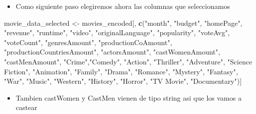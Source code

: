 \documentclass[
]{article}
\newenvironment{Shaded}{\begin{snugshade}}{\end{snugshade}}
\newcommand{\FunctionTok}[1]{\textcolor[rgb]{0.13,0.29,0.53}{\textbf{#1}}}
\newcommand{\NormalTok}[1]{#1}
\newcommand{\OtherTok}[1]{\textcolor[rgb]{0.56,0.35,0.01}{#1}}
\newcommand{\SpecialCharTok}[1]{\textcolor[rgb]{0.81,0.36,0.00}{\textbf{#1}}}
\newcommand{\StringTok}[1]{\textcolor[rgb]{0.31,0.60,0.02}{#1}}
\providecommand{\tightlist}{%
  \setlength{\itemsep}{0pt}\setlength{\parskip}{0pt}}
\begin{document}
\begin{itemize}
\tightlist
\item
  Como siguiente paso elegiremos ahora las columnas que seleccionamos
\end{itemize}

\begin{Shaded}
\begin{Highlighting}[]
\NormalTok{movie\_data\_selected }\OtherTok{\textless{}{-}}\NormalTok{ movies\_encoded[, }\FunctionTok{c}\NormalTok{(}\StringTok{"month"}\NormalTok{, }\StringTok{"budget"}\NormalTok{, }\StringTok{"homePage"}\NormalTok{, }\StringTok{"revenue"}\NormalTok{, }\StringTok{"runtime"}\NormalTok{, }\StringTok{"video"}\NormalTok{, }\StringTok{"originalLanguage"}\NormalTok{, }\StringTok{"popularity"}\NormalTok{, }\StringTok{"voteAvg"}\NormalTok{, }\StringTok{"voteCount"}\NormalTok{, }\StringTok{"genresAmount"}\NormalTok{, }\StringTok{"productionCoAmount"}\NormalTok{, }\StringTok{"productionCountriesAmount"}\NormalTok{, }\StringTok{"actorsAmount"}\NormalTok{, }\StringTok{"castWomenAmount"}\NormalTok{, }\StringTok{"castMenAmount"}\NormalTok{, }\StringTok{"Crime"}\NormalTok{,}\StringTok{"Comedy"}\NormalTok{, }\StringTok{"Action"}\NormalTok{, }\StringTok{"Thriller"}\NormalTok{, }\StringTok{"Adventure"}\NormalTok{, }\StringTok{"Science Fiction"}\NormalTok{, }\StringTok{"Animation"}\NormalTok{, }\StringTok{"Family"}\NormalTok{, }\StringTok{"Drama"}\NormalTok{, }\StringTok{"Romance"}\NormalTok{, }\StringTok{"Mystery"}\NormalTok{, }\StringTok{"Fantasy"}\NormalTok{, }\StringTok{"War"}\NormalTok{, }\StringTok{"Music"}\NormalTok{, }\StringTok{"Western"}\NormalTok{, }\StringTok{"History"}\NormalTok{, }\StringTok{"Horror"}\NormalTok{, }\StringTok{"TV Movie"}\NormalTok{, }\StringTok{"Documentary"}\NormalTok{)]}
\end{Highlighting}
\end{Shaded}

\begin{itemize}
\tightlist
\item
  Tambien castWomen y CastMen vienen de tipo string asi que los vamos a
  castear
\end{itemize}

\begin{Shaded}
\end{Shaded}
\end{document}
